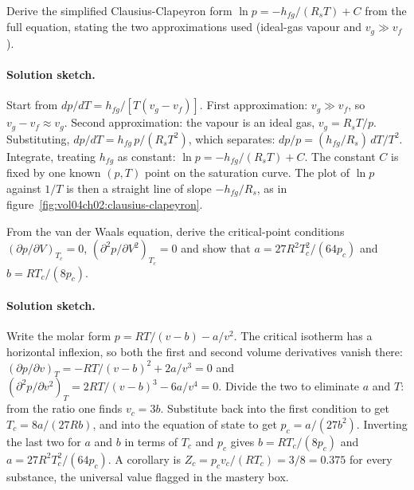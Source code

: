 \begin{exercise}
Derive the simplified Clausius-Clapeyron form $\ln p = -h_{fg}/(R_s
T) + C$ from the full equation, stating the two approximations used
(ideal-gas vapour and $v_g \gg v_f$).

\paragraph{Solution sketch.} Start from $dp/dT = h_{fg}/[T(v_g - v_f)]$.
First approximation: $v_g \gg v_f$, so $v_g - v_f \approx v_g$. Second
approximation: the vapour is an ideal gas, $v_g = R_s T/p$. Substituting,
$dp/dT = h_{fg}\,p/(R_s T^2)$, which separates: $dp/p = (h_{fg}/R_s)\,
dT/T^2$. Integrate, treating $h_{fg}$ as constant: $\ln p = -h_{fg}/(R_s
T) + C$. The constant $C$ is fixed by one known $(p, T)$ point on the
saturation curve. The plot of $\ln p$ against $1/T$ is then a straight
line of slope $-h_{fg}/R_s$, as in
figure~\ref{fig:vol04ch02:clausius-clapeyron}.
\end{exercise}

\begin{exercise}
From the van der Waals equation, derive the critical-point conditions
$(\partial p/\partial V)_{T_c} = 0$, $(\partial^2 p/\partial V^2)_{T_c}
= 0$ and show that $a = 27 R^2 T_c^2 / (64 p_c)$ and $b = R T_c /
(8 p_c)$.
\paragraph{Solution sketch.} Write the molar form $p = RT/(v - b) -
a/v^2$. The critical isotherm has a horizontal inflexion, so both the
first and second volume derivatives vanish there:
$(\partial p/\partial v)_T = -RT/(v-b)^2 + 2a/v^3 = 0$ and
$(\partial^2 p/\partial v^2)_T = 2RT/(v-b)^3 - 6a/v^4 = 0$. Divide the two
to eliminate $a$ and $T$: from the ratio one finds $v_c = 3b$. Substitute
back into the first condition to get $T_c = 8a/(27Rb)$, and into the
equation of state to get $p_c = a/(27b^2)$. Inverting the last two for
$a$ and $b$ in terms of $T_c$ and $p_c$ gives $b = RT_c/(8p_c)$ and
$a = 27R^2T_c^2/(64p_c)$. A corollary is $Z_c = p_c v_c/(RT_c) = 3/8 =
0.375$ for every substance, the universal value flagged in the mastery
box.
\end{exercise}

